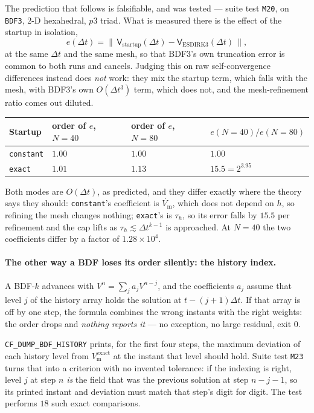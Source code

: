 \documentclass[11pt,a4paper]{article}
\newcommand{\code}[1]{\texttt{\small #1}}
\newcommand{\Vm}{V_{\text{m}}}
\begin{document}
The prediction that follows is falsifiable, and was tested --- suite test
\code{M20}, on \code{BDF3}, 2-D hexahedral, $p3$ triad. What is measured there is
the effect of the startup in isolation,
\begin{equation}
  e(\Delta t) = \bigl\|\,\mathsf{V}_{\text{startup}}(\Delta t)
  - \mathsf{V}_{\text{ESDIRK3}}(\Delta t)\,\bigr\|,
  \label{eq:startup-effect}
\end{equation}
at the same $\Delta t$ and the same mesh, so that BDF3's own truncation error is
common to both runs and cancels. Judging this on raw self-convergence
differences instead does \emph{not} work: they mix the startup term, which falls
with the mesh, with BDF3's own $O(\Delta t^3)$ term, which does not, and the
mesh-refinement ratio comes out diluted.
\begin{center}
\begin{tabular}{@{}llll@{}}
\toprule
Startup & order of $e$, $N=40$ & order of $e$, $N=80$ & $e(N{=}40)/e(N{=}80)$ \\
\midrule
\code{constant} & $1.00$ & $1.00$ & $1.00$ \\
\code{exact}    & $1.01$ & $1.13$ & $\mathbf{15.5}=2^{3.95}$ \\
\bottomrule
\end{tabular}
\end{center}
Both modes are $O(\Delta t)$, as predicted, and they differ exactly where the
theory says they should: \code{constant}'s coefficient is $\dot{\Vm}$, which does
not depend on $h$, so refining the mesh changes nothing; \code{exact}'s is
$\tau_h$, so its error falls by $15.5$ per refinement and the cap lifts as
$\tau_h\lesssim\Delta t^{k-1}$ is approached. At $N=40$ the two coefficients
differ by a factor of $1.28\times10^{4}$.

\paragraph{The other way a BDF loses its order silently: the history index.}
A BDF-$k$ advances with $V^n=\sum_j a_j V^{n-j}$, and the coefficients $a_j$
assume that level $j$ of the history array holds the solution at
$t-(j+1)\Delta t$. If that array is off by one step, the formula combines the
wrong instants with the right weights: the order drops and \emph{nothing reports
it} --- no exception, no large residual, exit $0$.

\code{CF\_DUMP\_BDF\_HISTORY} prints, for the first four steps, the maximum
deviation of each history level from $\Vm^{\text{exact}}$ at the instant that
level should hold. Suite test \code{M23} turns that into a criterion with no
invented tolerance: if the indexing is right, level $j$ at step $n$ \emph{is} the
field that was the previous solution at step $n-j-1$, so its printed instant and
deviation must match that step's digit for digit. The test performs $18$ such
exact comparisons.
\end{document}
